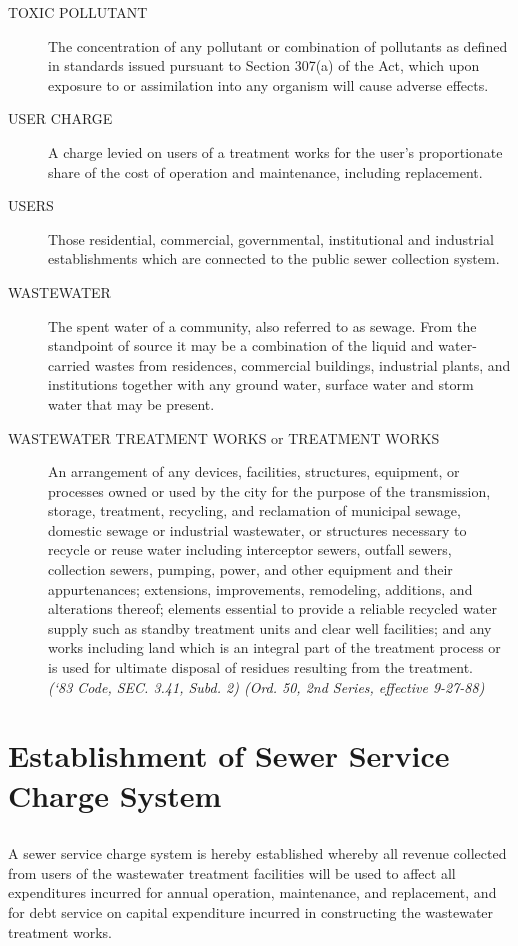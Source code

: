 \begin{description}
\item[TOXIC POLLUTANT] The concentration of any pollutant or combination of pollutants as defined in standards issued pursuant to Section 307(a) of the Act, which upon exposure to or assimilation into any organism will cause adverse effects.
\item[USER CHARGE] A charge levied on users of a treatment works for the user’s proportionate share of the cost of operation and maintenance, including replacement.
\item[USERS] Those residential, commercial, governmental, institutional and industrial establishments which are connected to the public sewer collection system.
\item[WASTEWATER] The spent water of a community, also referred to as sewage.  From the standpoint of source it may be a combination of the liquid and water-carried wastes from residences, commercial buildings, industrial plants, and institutions together with any ground water, surface water and storm water that may be present.
\item[WASTEWATER TREATMENT WORKS or TREATMENT WORKS] An arrangement of any devices, facilities, structures, equipment, or processes owned or used by the city for the purpose of the transmission, storage, treatment, recycling, and reclamation of municipal sewage, domestic sewage or industrial wastewater, or structures necessary to recycle or reuse water including interceptor sewers, outfall sewers, collection sewers, pumping, power, and other equipment and their appurtenances; extensions, improvements, remodeling, additions, and alterations thereof; elements essential to provide a reliable recycled water supply such as standby treatment units and clear well facilities; and any works including land which is an integral part of the treatment process or is used for ultimate disposal of residues resulting from the treatment.\\
\emph{(‘83 Code, SEC. 3.41, Subd. 2) (Ord. 50, 2nd Series, effective 9-27-88)}
\end{description}
\section{Establishment of Sewer Service Charge System}
\subsection{}
A sewer service charge system is hereby established whereby all revenue collected from users of the wastewater treatment facilities will be used to affect all expenditures incurred for annual operation, maintenance, and replacement, and for debt service on capital expenditure incurred in constructing the wastewater treatment works.
